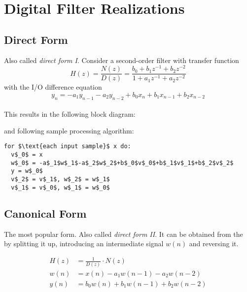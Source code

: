\section{Digital Filter Realizations}

\subsection{Direct Form}
\label{sec:directform}
Also called \emph{direct form I}. Consider a second-order filter with
transfer function
\begin{equation*}
	H(z) = \frac{N(z)}{D(z)}
		 = \frac{b_0 + b_1z^{-1} + b_2z^{-2}}{1 + a_1z^{-1} + a_2z^{-2}}
\end{equation*}
with the I/O difference equation
\begin{equation*}
	y_n = -a_1 y_{n-1} - a_2 y_{n-2} + b_0 x_n + b_1 x_{n-1} + b_2 x_{n-2}
\end{equation*}\\

This results in the following block diagram: \\

\begin{center}
	
\end{center}

and following sample processing algorithm:
\begin{lstlisting}[mathescape]
for $\text{each input sample}$ x do:
  v$_0$ = x
  w$_0$ = -a$_1$w$_1$-a$_2$w$_2$+b$_0$v$_0$+b$_1$v$_1$+b$_2$v$_2$
  y = w$_0$
  v$_2$ = v$_1$, w$_2$ = w$_1$
  v$_1$ = v$_0$, w$_1$ = w$_0$
\end{lstlisting}

\subsection{Canonical Form}
\label{sec:canonicalform}
The most popular form. Also called \emph{direct form II}. It can be obtained from
the  by splitting it up, introducing an intermediate signal $w(n)$ and reversing it.

\begin{align*}
	H(z) &= \frac{1}{D(z)} \cdot N(z) \\
	w(n) &= x(n) - a_1 w(n-1) - a_2 w(n-2) \\
	y(n) &= b_0 w(n) + b_1 w(n-1) + b_2 w(n-2) \\
\end{align*}\\

